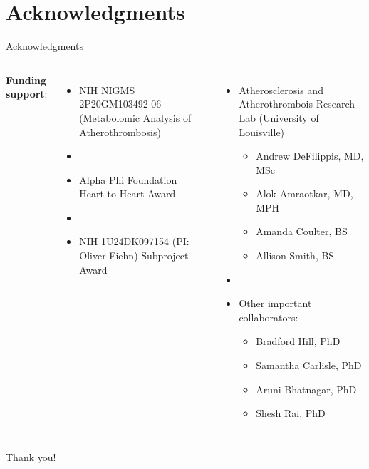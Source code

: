 \documentclass[xcolor=dvipsnames]{beamer}
\begin{document}
\section{Acknowledgments}

\begin{frame}{Acknowledgments}
	\begin{columns}
			\textbf{Funding support}:
			\begin{itemize}
				\item NIH NIGMS 2P20GM103492-06 (Metabolomic Analysis of Atherothrombosis)
				\item[]
				\item Alpha Phi Foundation Heart-to-Heart Award
				\item[]
				\item NIH 1U24DK097154 (PI: Oliver Fiehn) Subproject Award
			\end{itemize}
			\begin{itemize}
				\item Atherosclerosis and Atherothrombois Research Lab (University of Louisville)
				\begin{itemize}
					\item Andrew DeFilippis, MD, MSc
					\item Alok Amraotkar, MD, MPH
					\item Amanda Coulter, BS
					\item Allison Smith, BS
				\end{itemize}
				\item[]
				\item Other important collaborators:
				\begin{itemize}
					\item Bradford Hill, PhD
					\item Samantha Carlisle, PhD
					\item Aruni Bhatnagar, PhD
					\item Shesh Rai, PhD
				\end{itemize}
			\end{itemize}
	\end{columns}
\end{frame}

\begin{frame}
\begin{center}
	\huge{Thank you!}	
\end{center}
\end{frame}
\end{document}
